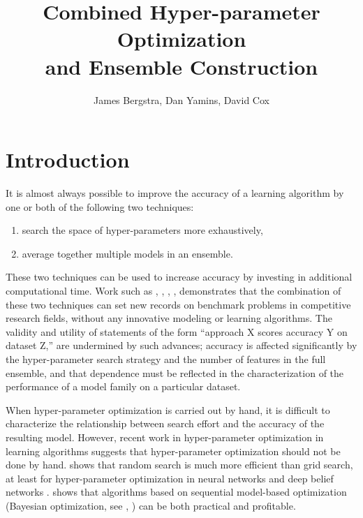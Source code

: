 \documentclass[11pt,twocolumn]{article}
\title{Combined Hyper-parameter Optimization\\and Ensemble Construction}
\author{James Bergstra, Dan Yamins, David Cox}
\begin{document}
\maketitle


\section{Introduction}

It is almost always possible to improve the accuracy of a learning algorithm
by one or both of the following two techniques:
\begin{enumerate}
 \item search the space of hyper-parameters more exhaustively,
 \item average together multiple models in an ensemble.
\end{enumerate}

\vspace{11pt}
These two techniques can be used to increase accuracy
by investing in additional computational time.
Work such as \citet{plos_ht}, \citet{fg11}, \citet{coates+lee+ng:2010},
\citet{gehler}, \citet{bergstra+bardenet+bengio+kegl:2011}
demonstrates that the combination of these two techniques can set new records on
benchmark problems in competitive research fields,
without any innovative modeling or learning algorithms.
The validity and utility of statements of the form
``approach X scores accuracy Y on dataset Z,''
are undermined by such advances; accuracy is
affected significantly by the hyper-parameter search strategy and the
number of features in the full ensemble, and that dependence must
be reflected in the characterization of the performance of a model family
on a particular dataset.

\vspace{11pt}
When hyper-parameter optimization is carried out by hand, it is difficult
to characterize the relationship between search effort and the accuracy of the
resulting model. However, recent work in hyper-parameter optimization in
learning algorithms suggests that hyper-parameter optimization should not be done by hand.
\citet{bergstra+bengio:2012} shows that random search is much more efficient
than grid search,
at least for hyper-parameter optimization in neural networks and deep belief networks \citep{hinton+osinero+teh:2006}.
\citet{bergstra+bardenet+bengio+kegl:2011} shows that algorithms based on
sequential model-based optimization (Bayesian optimization,
see \citep{hutter:2006}, \citet{brochu:2008})
can be both practical and profitable.
\end{document}

